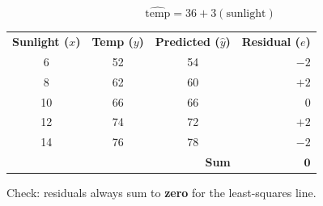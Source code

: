 \documentclass[aspectratio=169, 11pt]{beamer}
\begin{document}
\begin{frame}[t, plain]

  \[
    \widehat{\text{temp}} = 36 + 3(\text{sunlight})
  \]

  \vspace{0.1in}
  \renewcommand{\arraystretch}{1.6}
  \begin{tabular}{cccr}
    \rowcolor{sky}
    \textbf{Sunlight ($x$)} & \textbf{Temp ($y$)} & \textbf{Predicted ($\hat{y}$)} &
    \textbf{Residual ($e$)} \\
    6  & 52 & 54 & $-2$ \\
    8  & 62 & 60 & $+2$ \\
    10 & 66 & 66 & $0$ \\
    12 & 74 & 72 & $+2$ \\
    14 & 76 & 78 & $-2$ \\
    \hline
    \multicolumn{3}{r}{\textbf{Sum}} & $\mathbf{0}$ \\
  \end{tabular}

  \vspace{0.15in}
  {\small Check: residuals always sum to \textbf{zero} for the least-squares line.}
\end{frame}
\end{document}
